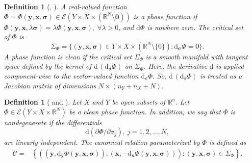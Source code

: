 \documentclass[11pt]{article}
\newcommand{\be}{\begin{equation}}
\newcommand{\ee}{\end{equation}}
\newcommand{\br}{\mathbb{R}}
\newcommand{\pa}{\partial}
\newcommand{\la}{\lambda}
\newcommand{\dd}{\mathrm{d}}
\numberwithin{equation}{section}
\newcommand{\smo}{\setminus \mathbf{0}}
\newcommand{\paren}[1]{\left(#1\right)}               %
\newcommand{\sparen}[1]{\left\{#1\right\}}      %
\newcommand{\vy}{\mathbf{y}}
\newcommand{\vx}{\mathbf{x}}
\newcommand{\Cc}{\mathcal{C}}
\newcommand{\Ec}{\mathcal{E}}
\newcommand{\vsig}{{\boldsymbol{\sigma}}}
\newcommand{\rr}{{{\mathbb R}}}
\newcommand{\rn}{{{\mathbb R}^n}}
\newtheorem{definition}[theorem]{Definition}
\theoremstyle{definition}
\begin{document}
\begin{definition}[{\cite[Section 7.8]{hor}, \cite[Definition 21.2.15]{hor3}}] \label{phasedef}
A real-valued function $\Phi=\Phi(\vy,\vx,\vsig)\in \Ec(Y\times X\times(\br^N\smo))$ is a \emph{phase
function} if $\Phi(\vy,\vx,\lambda\vsig)=\lambda\Phi(\vy,\vx,\vsig)$, $\forall \la>0$, and $\mathrm{d}\Phi$ is nowhere zero. The \emph{critical set of $\Phi$} is
\be
\Sigma_\Phi=\{(\vy,\vx,\vsig)\in Y\times X\times(\br^N\setminus\{0\}): \dd_{\vsig}\Phi=0\}.
\ee
 A phase function is
\emph{clean} if the critical set $\Sigma_\Phi$ is a smooth manifold {with tangent space defined {by} the kernel of $\mathrm{d}\,(\mathrm{d}_\sigma\Phi)$ on $\Sigma_\Phi$. Here, the derivative $\mathrm{d}$ is applied component-wise to the vector-valued function $\mathrm{d}_\sigma\Phi$. So, $\mathrm{d}\,(\mathrm{d}_\sigma\Phi)$ is treated as a Jacobian matrix of dimensions $N\times ({n_Y + n_X}+N)$.}
\end{definition}




\begin{definition}[{\cite[Definition 21.2.15]{hor3} and \cite[section 25.2]{hor4}}]\label{def:canon} 
Let $X$ and $Y$ be open subsets of $\rn$. Let $\Phi\in \Ec\paren{Y \times X \times{\rr}^N}$ be a clean phase function.  In addition, we say that $\Phi$ is nondegenerate if the differentials 
\be
\dd (\pa\Phi/\pa \sigma_j),\ j=1,2,\dots,N,
\ee
are linearly independent.
The canonical relation parameterized by $\Phi$ is defined as
\be\label{def:Cgenl} \begin{aligned} \Cc=&\sparen{
\paren{\paren{\vy,\dd_{\vy}\Phi(\vy,\vx,\vsig)};\paren{\vx,-\dd_{\vx}\Phi(\vy,\vx,\vsig)}}:(\vy,\vx,\vsig)\in
\Sigma_{\Phi}}{.}
\end{aligned}
\ee
\end{definition}
\end{document}
